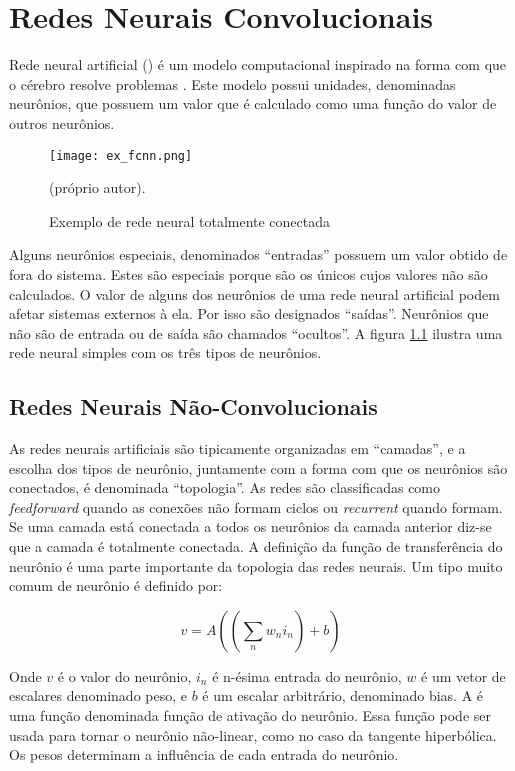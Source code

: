 
\chapter{Redes Neurais Convolucionais}
\setcounter{figure}{100}

Rede neural artificial () é um modelo computacional inspirado na forma com
que o cérebro resolve problemas \cite{gilbert2000build}. Este modelo possui
unidades, denominadas neurônios, que possuem um valor que é calculado como uma
função do valor de outros neurônios.

\begin{figure}[!htb]
	\centering
	\texttt{[image: ex\_fcnn.png]}
	\caption{Exemplo de rede neural totalmente conectada}
	\label{fig:ex_fcnn}
	(próprio autor).
\end{figure}

Alguns neurônios especiais, denominados “entradas” possuem um valor obtido de
fora do sistema. Estes são especiais porque são os únicos cujos valores não são
calculados. O valor de alguns dos neurônios de uma rede neural artificial podem
afetar sistemas externos à ela. Por isso são designados “saídas”. Neurônios que
não são de entrada ou de saída são chamados “ocultos”. A figura
\ref{fig:ex_fcnn} ilustra uma rede neural simples com os três tipos de
neurônios.

\section{Redes Neurais Não-Convolucionais}
As redes neurais artificiais são tipicamente organizadas em “camadas”, e a
escolha dos tipos de neurônio, juntamente com a forma com que os neurônios são
conectados, é denominada “topologia”. As redes são classificadas como
\emph{feedforward} quando as conexões não formam ciclos ou \emph{recurrent}
quando formam. Se
uma camada está conectada a todos os neurônios da camada anterior diz-se que a
camada é totalmente conectada.
A definição da função de transferência do neurônio é uma parte importante da
topologia das redes neurais. Um tipo muito comum de neurônio é definido por:

\begin{equation} \label{eq:non-conv-layer}
	v=A \left( \left( \sum_n w_n i_n \right) + b \right)
\end{equation}

Onde $v$ é o valor do neurônio, $i_n$ é n-ésima entrada do neurônio,
$w$ é um vetor de escalares denominado peso, e $b$ é um escalar arbitrário,
denominado bias. A é uma
função denominada função de ativação do neurônio. Essa função pode ser usada
para tornar o neurônio não-linear, como no caso da tangente hiperbólica. Os
pesos determinam a influência de cada entrada do neurônio.

